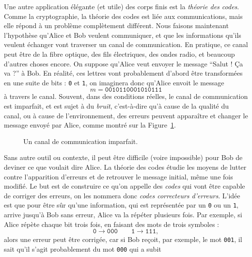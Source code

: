 Une autre application élégante (et utile) des corps finis est la \emph{théorie
des codes}. Comme la cryptographie, la théorie des codes est liée aux
communications, mais elle répond à un problème complètement différent. Nous
faisons maintenant l'hypothèse qu'Alice et Bob veulent communiquer, et que les
informations qu'ils veulent échanger vont traverser un canal de communication.
En pratique, ce canal peut être de la fibre optique, des fils électriques, des
ondes radio, et beaucoup d'autres choses encore. On suppose qu'Alice veut
envoyer le message ``Salut ! Ça va ?'' à Bob. En réalité, ces lettres vont
probablement d'abord être transformées en une suite de bits : \texttt{0} et
\texttt{1}, on imaginera donc qu'Alice envoit le message
\[
  m = \texttt{0010110001010111}
\]
à travers le canal. Souvent, dans des conditions réelles, le canal de
communication est imparfait, et est sujet à du \emph{bruit}, c'est-à-dire qu'à
cause de la qualité du canal, ou à cause de l'environnement, des erreurs peuvent
apparaître et changer le message envoyé par Alice, comme montré sur la
Figure~\ref{fig:communication-channel}.
\begin{figure}
  \centering
  \caption{Un canal de communication imparfait.}
  \label{fig:communication-channel}
\end{figure}
Sans autre outil ou contexte, il peut être difficile (voire impossible) pour Bob
de deviner ce que voulait dire Alice. La théorie des codes étudie les moyens de
lutter contre l'apparition d'erreurs et de retrouver le message initial, même
une fois modifié. Le but est de construire ce qu'on appelle des \emph{codes} qui
vont être capable de corriger des erreurs, on les nommera donc \emph{codes
correcteurs d'erreurs}. L'idée est que pour être sûr qu'une information, qui est
représentée par un \texttt{0} ou un \texttt{1}, arrive jusqu'à Bob sans erreur,
Alice va la répéter plusieurs fois. Par exemple, si Alice répète chaque bit
trois fois, en faisant des mots de trois symboles :
\[
  \texttt{0}\to\texttt{000}\quad\quad\texttt{1}\to\texttt{111},
\]
alors une erreur peut être corrigée, car si Bob reçoit, par exemple, le mot
\texttt{001}, il sait qu'il s'agit probablement du mot \texttt{000} qui a subit
